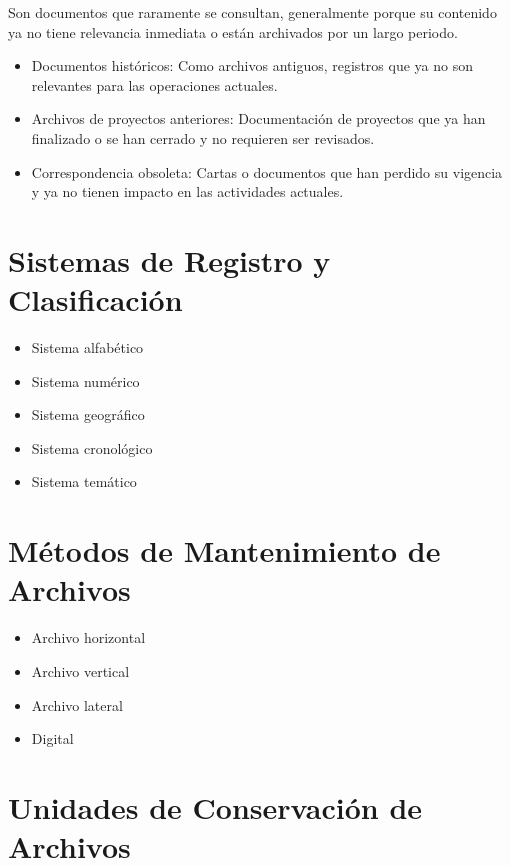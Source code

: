 \documentclass{article}
\begin{document}
Son documentos que raramente se consultan, generalmente porque su contenido ya no tiene relevancia inmediata o están archivados por un largo periodo.

\begin{itemize}
    \item   Documentos históricos: Como archivos antiguos, registros que ya no son relevantes para las operaciones actuales.
    \item   Archivos de proyectos anteriores: Documentación de proyectos que ya han finalizado o se han cerrado y no requieren ser revisados.
    \item   Correspondencia obsoleta: Cartas o documentos que han perdido su vigencia y ya no tienen impacto en las actividades actuales.
\end{itemize}

\hrulefill

\section{Sistemas de Registro y Clasificación}

\begin{itemize}
    \item   Sistema alfabético
    \item   Sistema numérico
    \item   Sistema geográfico
    \item   Sistema cronológico
    \item   Sistema temático
\end{itemize}

\hrulefill

\section{Métodos de Mantenimiento de Archivos}

\begin{itemize}
    \item   Archivo horizontal
    \item   Archivo vertical
    \item   Archivo lateral
    \item   Digital
\end{itemize}

\hrulefill

\section{Unidades de Conservación de Archivos}
\end{document}
